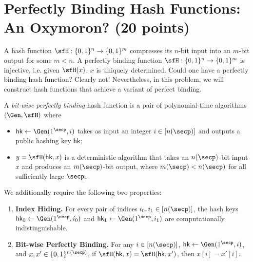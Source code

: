 \documentclass{article}
\newcommand{\hk}{\mathsf{hk}}
\begin{document}
\section{Perfectly Binding Hash Functions: An Oxymoron? (20 points)}
A hash function $\sfH: \{0,1\}^n \to \{0,1\}^m$ compresses its $n$-bit input into an $m$-bit output for some $m < n$. A perfectly binding function $\sfH: \{0,1\}^n \to \{0,1\}^m$ is injective, i.e. given $\sfH(x)$, $x$ is uniquely determined. Could one have a perfectly binding hash function? Clearly not! Nevertheless, in this problem, we will construct hash functions that achieve a variant of perfect binding. 
\begin{definition}
    A \emph{bit-wise perfectly binding} hash function is a pair of polynomial-time algorithms $(\Gen, \sfH)$ where 
    \begin{itemize}
        \item $\hk \gets \Gen(1^{\secp}, i)$ takes as input an integer $i \in [n(\secp)]$ and outputs a public hashing key $\hk$;
        \item $y = \sfH(\hk, x)$ is a deterministic algorithm that takes an $n(\secp)$-bit input $x$ and produces an $m(\secp)$-bit output, where $m(\secp) < n(\secp)$ for all sufficiently large $\secp$.
    \end{itemize}
    We additionally require the following two properties:
    \begin{enumerate}
        \item \textbf{Index Hiding.} For every pair of indices $i_0, i_1 \in [n(\secp)]$, the hash keys $\hk_0 \gets \Gen(1^{\secp}, i_0)$ and $\hk_1 \gets \Gen(1^{\secp}, i_1)$ are computationally indistinguishable.
        \item \textbf{Bit-wise Perfectly Binding.} For any $i \in [n(\secp)]$, $\hk \gets \Gen(1^{\secp}, i)$, and $x, x' \in \{0, 1\}^{n(\secp)}$, if $\sfH(\hk, x) = \sfH(\hk, x')$, then $x[i] = x'[i]$.
    \end{enumerate}
\end{definition}
\def\FHE{\mathsf{FHE}}
\end{document}
